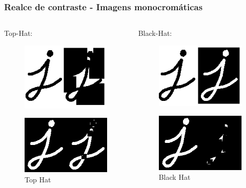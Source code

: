 \documentclass[aspectratio=169]{beamer}
\theoremstyle{Definition}
\begin{document}
\begin{frame}
	\frametitle{Realce de contraste - Imagens monocromáticas}

	
	\begin{columns}
		\begin{column}{0.5\textwidth}
		Top-Hat: 
			\begin{figure}[h]
	  		 	\includegraphics[height=0.2\paperheight]{imagens/tophat}
			\end{figure}
			\begin{figure}[h]
	  		 	\includegraphics[height=0.2\paperheight]{imagens/tophat1}
				\caption{Top Hat}\label{figLogical}
			\end{figure}
		\end{column}
		\begin{column}{0.5\textwidth}
		Black-Hat:
			\begin{figure}[h]
			   	\includegraphics[height=0.2\paperheight]{imagens/blackhat}
			\end{figure}
			\begin{figure}[h]
	  		 	\includegraphics[height=0.2\paperheight]{imagens/blackhat1}
				\caption{Black Hat}\label{figLogical}
			\end{figure}
		\end{column}
	\end{columns}
	
\end{frame}
\end{document}
